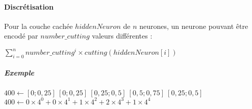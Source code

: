 \paragraph{Discrétisation} \label{discretize}
      Pour la couche cachée $hiddenNeuron$ de $n$ neurones, un neurone
      pouvant être encodé par $number\_cutting$ valeurs différentes :
      \begin{center}
	$\sum \limits_{i=0}^{n} number\_cutting^{i} \times cutting(hiddenNeuron[i]) $
      \end{center}
      \subparagraph{Exemple}
	$400 \gets [0 ; 0,25 ]\ [0 ; 0,25 ]\  [0,25 ; 0,5 ]\  [0,5 ; 0,75 ]\  [0,25 ; 0,5 ]$ \\
	\hspace*{2.70cm}
	$400 \gets 0\times4^0 +   0\times4^1  +   1\times4^2   +  2\times4^3   +   1 \times4^4$
